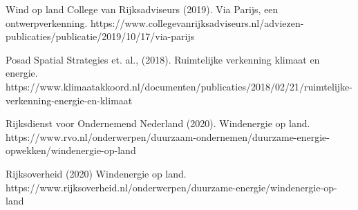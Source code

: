 \begin{voorstel}{Wind op land}
College van Rijksadviseurs (2019). Via Parijs, een ontwerpverkenning. https://www.collegevanrijksadviseurs.nl/adviezen-publicaties/publicatie/2019/10/17/via-parijs

Posad Spatial Strategies et. al., (2018). Ruimtelijke verkenning klimaat en energie. https://www.klimaatakkoord.nl/documenten/publicaties/2018/02/21/ruimtelijke-verkenning-energie-en-klimaat

Rijksdienst voor Ondernemend Nederland (2020). Windenergie op land. https://www.rvo.nl/onderwerpen/duurzaam-ondernemen/duurzame-energie-opwekken/windenergie-op-land

Rijksoverheid (2020) Windenergie op land. https://www.rijksoverheid.nl/onderwerpen/duurzame-energie/windenergie-op-land

\end{voorstel}
